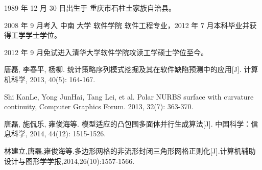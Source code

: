 \begin{resume}


  1989 年 12 月 30 日出生于 重庆市石柱土家族自治县。
  
  2008 年 9 月考入 中南 大学 软件学院 软件工程专业，2012 年 7 月本科毕业并获得工学学士学位。
  
  2012 年 9 月免试进入清华大学软件学院攻读工学硕士学位至今。


  \begin{enumerate}[{[}1{]}]
  \item 唐磊, 李春平, 杨柳. 统计策略序列模式挖掘及其在软件缺陷预测中的应用[J]. 计算机科学, 2013, 40(5): 164-167.
  \item Shi KanLe, Yong JunHai, Tang Lei, et al. Polar NURBS surface with curvature continuity, Computer Graphics Forum. 2013, 32(7): 363-370.
  \item 唐磊, 施侃乐, 雍俊海等. 模型适应的凸包围多面体并行生成算法[J]. 中国科学：信息科学, 2014, 44(12): 1515-1526.
  \item 林建立,唐磊,雍俊海等.多边形网格的非流形封闭三角形网格正则化[J].计算机辅助设计与图形学学报,2014,26(10):1557-1566.
  \end{enumerate}


\end{resume}
